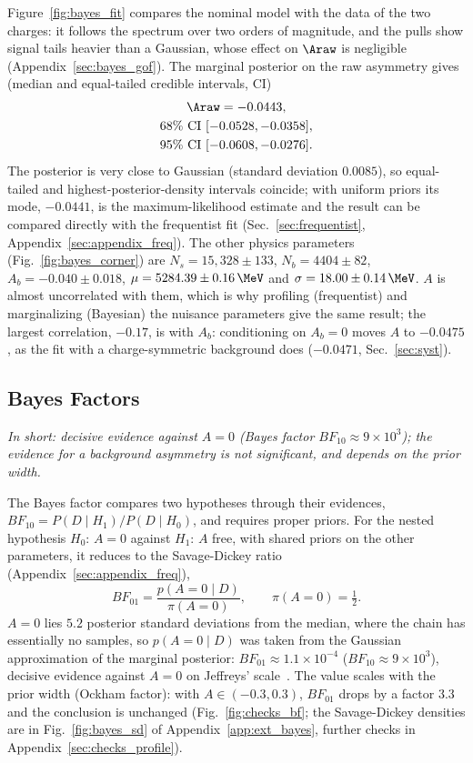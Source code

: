 Figure~\ref{fig:bayes_fit} compares the nominal model with the data of the two charges: it follows the spectrum over two orders of magnitude, and the pulls show signal tails heavier than a Gaussian, whose effect on $\Araw$ is negligible (Appendix~\ref{sec:bayes_gof}). The marginal posterior on the raw asymmetry gives (median and equal-tailed credible intervals, CI)
\begin{gather*}
\Araw = -0.0443, \\
68\%~\text{CI}~[-0.0528,-0.0358], \\ 95\%~\text{CI}~[-0.0608,-0.0276].
\end{gather*}
The posterior is very close to Gaussian (standard deviation $0.0085$), so equal-tailed and highest-posterior-density intervals coincide; with uniform priors its mode, $-0.0441$, is the maximum-likelihood estimate and the result can be compared directly with the frequentist fit (Sec.~\ref{sec:frequentist}, Appendix~\ref{sec:appendix_freq}). The other physics parameters (Fig.~\ref{fig:bayes_corner}) are $N_s=15{,}328\pm133$, $N_b=4404\pm82$, $A_b=-0.040\pm0.018$, $\mu=5284.39\pm0.16\,\MeV$ and $\sigma=18.00\pm0.14\,\MeV$. $A$ is almost uncorrelated with them, which is why profiling (frequentist) and marginalizing (Bayesian) the nuisance parameters give the same result; the largest correlation, $-0.17$, is with $A_b$: conditioning on $A_b=0$ moves $A$ to $-0.0475$, as the fit with a charge-symmetric background does ($-0.0471$, Sec.~\ref{sec:syst}).




\subsection{Bayes Factors}
\label{sec:bayes_factor}
\emph{In short: decisive evidence against $A=0$ (Bayes factor $BF_{10}\approx9\times10^3$); the evidence for a background asymmetry is not significant, and depends on the prior width.}

The Bayes factor compares two hypotheses through their evidences, $BF_{10}=P(D\mid H_1)/P(D\mid H_0)$, and requires proper priors. For the nested hypothesis $H_0$: $A=0$ against $H_1$: $A$ free, with shared priors on the other parameters, it reduces to the Savage-Dickey ratio~\cite{dickey1971} (Appendix~\ref{sec:appendix_freq}),
\[
BF_{01} = \frac{p(A=0\mid D)}{\pi(A=0)}, \qquad \pi(A=0)=\tfrac12 .
\]
$A=0$ lies $5.2$ posterior standard deviations from the median, where the chain has essentially no samples, so $p(A=0\mid D)$ was taken from the Gaussian approximation of the marginal posterior: $BF_{01}\approx1.1\times10^{-4}$ ($BF_{10}\approx9\times10^{3}$), decisive evidence against $A=0$ on Jeffreys' scale~\cite{jeffreys}. The value scales with the prior width (Ockham factor): with $A\in(-0.3,0.3)$, $BF_{01}$ drops by a factor $3.3$ and the conclusion is unchanged (Fig.~\ref{fig:checks_bf}; the Savage-Dickey densities are in Fig.~\ref{fig:bayes_sd} of Appendix~\ref{app:ext_bayes}, further checks in Appendix~\ref{sec:checks_profile}).

